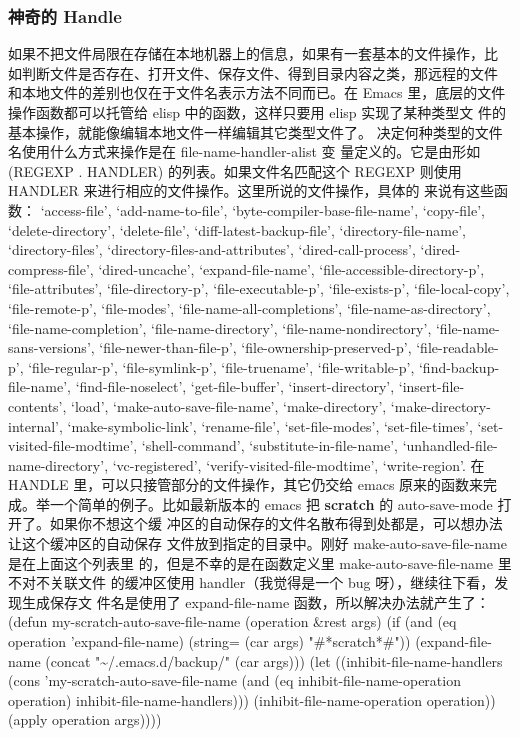 \documentclass[11pt]{ctexart}
\begin{document}
{{{{\subsubsection{神奇的 Handle}
\label{sec:org932b14d}
如果不把文件局限在存储在本地机器上的信息，如果有一套基本的文件操作，比 如判断文件是否存在、打开文件、保存文件、得到目录内容之类，那远程的文件 和本地文件的差别也仅在于文件名表示方法不同而已。在 Emacs 里，底层的文件 操作函数都可以托管给 elisp 中的函数，这样只要用 elisp 实现了某种类型文 件的基本操作，就能像编辑本地文件一样编辑其它类型文件了。
决定何种类型的文件名使用什么方式来操作是在 file-name-handler-alist 变 量定义的。它是由形如 (REGEXP . HANDLER) 的列表。如果文件名匹配这个 REGEXP 则使用 HANDLER 来进行相应的文件操作。这里所说的文件操作，具体的 来说有这些函数：
`access-file', `add-name-to-file', `byte-compiler-base-file-name',
`copy-file', `delete-directory', `delete-file',
`diff-latest-backup-file', `directory-file-name', `directory-files',
`directory-files-and-attributes', `dired-call-process',
`dired-compress-file', `dired-uncache',
`expand-file-name', `file-accessible-directory-p', `file-attributes',
`file-directory-p', `file-executable-p', `file-exists-p',
`file-local-copy', `file-remote-p', `file-modes',
`file-name-all-completions', `file-name-as-directory',
`file-name-completion', `file-name-directory', `file-name-nondirectory',
`file-name-sans-versions', `file-newer-than-file-p',
`file-ownership-preserved-p', `file-readable-p', `file-regular-p',
`file-symlink-p', `file-truename', `file-writable-p',
`find-backup-file-name', `find-file-noselect',
`get-file-buffer', `insert-directory', `insert-file-contents',
`load', `make-auto-save-file-name', `make-directory',
`make-directory-internal', `make-symbolic-link',
`rename-file', `set-file-modes', `set-file-times',
`set-visited-file-modtime', `shell-command', `substitute-in-file-name',
`unhandled-file-name-directory', `vc-registered',
`verify-visited-file-modtime',
`write-region'.
在 HANDLE 里，可以只接管部分的文件操作，其它仍交给 emacs 原来的函数来完 成。举一个简单的例子。比如最新版本的 emacs 把 \textbf{scratch} 的 auto-save-mode 打开了。如果你不想这个缓 冲区的自动保存的文件名散布得到处都是，可以想办法让这个缓冲区的自动保存 文件放到指定的目录中。刚好 make-auto-save-file-name 是在上面这个列表里 的，但是不幸的是在函数定义里 make-auto-save-file-name 里不对不关联文件 的缓冲区使用 handler（我觉得是一个 bug 呀），继续往下看，发现生成保存文 件名是使用了 expand-file-name 函数，所以解决办法就产生了：
(defun my-scratch-auto-save-file-name (operation \&rest args)
(if (and (eq operation 'expand-file-name)
(string= (car args) "\#*scratch*\#"))
(expand-file-name (concat "\textasciitilde{}/.emacs.d/backup/" (car args)))
(let ((inhibit-file-name-handlers
(cons 'my-scratch-auto-save-file-name
(and (eq inhibit-file-name-operation operation)
inhibit-file-name-handlers)))
(inhibit-file-name-operation operation))
(apply operation args))))
}}}}
\end{document}
